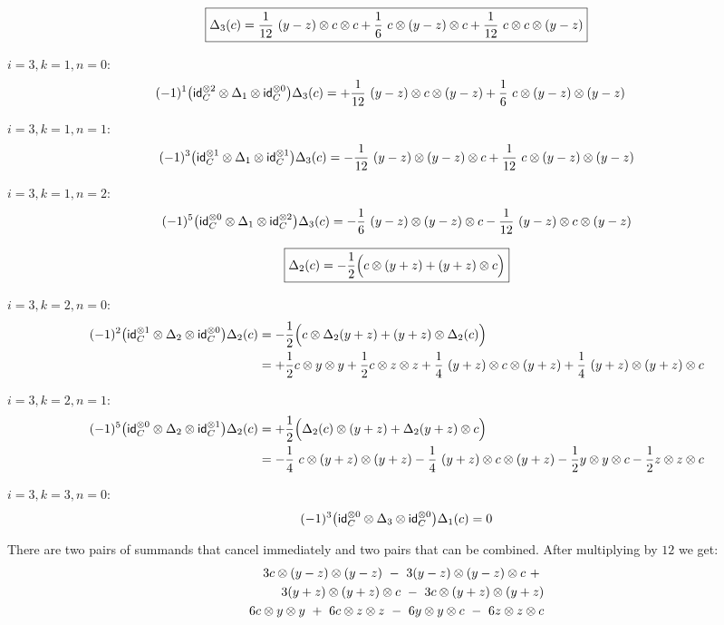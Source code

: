 \[
\boxed{\Delta_3(c) =
\frac{1}{12} \ (y-z) \otimes c \otimes c + \frac{1}{6} \ c \otimes (y-z) \otimes c + \frac{1}{12} \ c \otimes c \otimes (y-z)}
\]

\noindent $i=3, k=1, n=0$:
\begin{align*}
(-1)^1 \big( \mathsf{id}_C^{\otimes 2} \otimes \Delta_1 \otimes \mathsf{id}_C^{\otimes 0} \big) \Delta_3(c) & =
+ \frac{1}{12} \ (y-z) \otimes c \otimes (y-z) + \frac{1}{6} \ c \otimes (y-z) \otimes (y-z)
\end{align*}

\noindent $i=3, k=1, n=1$:
\begin{align*}
(-1)^3 \big( \mathsf{id}_C^{\otimes 1} \otimes \Delta_1 \otimes \mathsf{id}_C^{\otimes 1} \big) \Delta_3(c) =
- \frac{1}{12} \ (y-z) \otimes (y-z) \otimes c + \frac{1}{12} \ c \otimes (y-z) \otimes (y-z)
\end{align*}

\noindent $i=3, k=1, n=2$:
\begin{align*}
(-1)^5 \big( \mathsf{id}_C^{\otimes 0} \otimes \Delta_1 \otimes \mathsf{id}_C^{\otimes 2} \big) \Delta_3(c) =
-\frac{1}{6} \ (y-z) \otimes (y-z) \otimes c - \frac{1}{12} \ (y-z) \otimes c \otimes (y-z)
\end{align*}

\[
\boxed{\Delta_2(c) = -\frac{1}{2} \Big( c \otimes (y+z) + (y+z) \otimes c \Big)}
\]

\noindent $i=3, k=2, n=0$:
\begin{align*}
(-1)^2 \big( \mathsf{id}_C^{\otimes 1} \otimes \Delta_2 \otimes \mathsf{id}_C^{\otimes 0} \big) \Delta_2(c) &=
- \frac{1}{2} \Big( c \otimes \Delta_2(y+z) + (y+z) \otimes \Delta_2(c) \Big) \\ &=
+ \frac{1}{2} c \otimes y \otimes y + \frac{1}{2} c \otimes z \otimes z +
\frac{1}{4} \ (y+z) \otimes c \otimes (y+z) + \frac{1}{4} \ (y+z) \otimes (y+z) \otimes c
\end{align*}

\noindent $i=3, k=2, n=1$:
\begin{align*}
(-1)^5 \big( \mathsf{id}_C^{\otimes 0} \otimes \Delta_2 \otimes \mathsf{id}_C^{\otimes 1} \big) \Delta_2(c) &=
+ \frac{1}{2} \Big( \Delta_2(c) \otimes (y+z) + \Delta_2(y+z) \otimes c \Big) \\ &=
- \frac{1}{4} \ c \otimes (y+z) \otimes (y+z) - \frac{1}{4} \ (y+z) \otimes c \otimes (y+z)
- \frac{1}{2} y \otimes y \otimes c - \frac{1}{2} z \otimes z \otimes c
\end{align*}

\noindent $i=3, k=3, n=0$:
\begin{align*}
(-1)^3 \big( \mathsf{id}_C^{\otimes 0} \otimes \Delta_3 \otimes \mathsf{id}_C^{\otimes 0} \big) \Delta_1(c) = 0
\end{align*}

There are two pairs of summands that cancel immediately and two pairs that can be combined.
After multiplying by $12$ we get:
\begin{align*}
3 c \otimes (y-z) \otimes (y-z) \ - \
3 (y-z) \otimes (y-z) \otimes c \ + \ \\
3 (y+z) \otimes (y+z) \otimes c \ - \
3 c \otimes (y+z) \otimes (y+z) \\
6 c \otimes y \otimes y \ + \
6 c \otimes z \otimes z \ - \
6 y \otimes y \otimes c \ - \
6 z \otimes z \otimes c
\end{align*}

